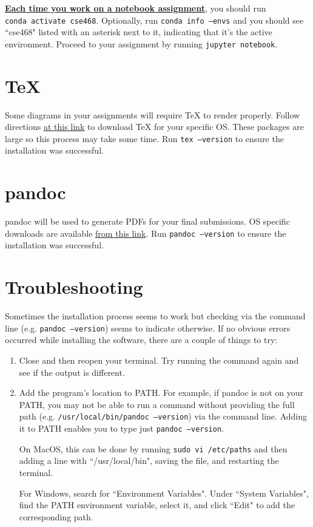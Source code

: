 \documentclass[12pt]{article}
\begin{document}
\textbf{\underline{Each time you work on a notebook assignment}}, you should run \\ \texttt{conda activate cse468}. Optionally, run \texttt{conda info --envs} and you should see ``cse468" listed with an asterisk next to it, indicating that it's the active environment. Proceed to your assignment by running \texttt{jupyter notebook}.


\section{TeX}
Some diagrams in your assignments will require TeX to render properly. Follow directions \href{https://nbconvert.readthedocs.io/en/latest/install.html#installing-tex}{at this link} to download TeX for your specific OS. These packages are large so this process may take some time. Run \texttt{tex --version} to ensure the installation was successful. 

\section{pandoc}
pandoc will be used to generate PDFs for your final submissions.
OS specific downloads are available \href{https://pandoc.org/installing.html}{from this link}. Run \texttt{pandoc --version} to ensure the installation was successful.

\section{Troubleshooting}
Sometimes the installation process seems to work but checking via the command line (e.g. \texttt{pandoc --version}) seems to indicate otherwise. If no obvious errors occurred while installing the software, there are a couple of things to try:
\begin{enumerate}
\item Close and then reopen your terminal. Try running the command again and see if the output is different.
\item Add the program's location to PATH. For example, if pandoc is not on your PATH, you may not be able to run a command without providing the full path (e.g. \texttt{/usr/local/bin/pandoc --version}) via the command line. Adding it to PATH enables you to type just \texttt{pandoc --version}. 

On MacOS, this can be done by running \texttt{sudo vi /etc/paths} and then adding a line with ``/usr/local/bin", saving the file, and restarting the terminal. 

For Windows, search for ``Environment Variables". Under ``System Variables", find the PATH environment variable, select it, and click ``Edit" to add the corresponding path. 


\end{enumerate}
\end{document}
